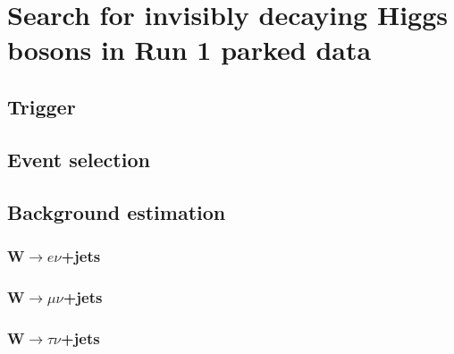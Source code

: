 \chapter{Search for invisibly decaying Higgs bosons in Run 1 parked data}
\label{chap:parked}

\section{Trigger}%
\label{sec:parkedtrigger}

\section{Event selection}%
\label{sec:parkedsel}

\section{Background estimation}%
\label{sec:parkedbkg}

\subsection{W$\rightarrow e\nu$+jets}%
\label{sec:parkedwenu}

\subsection{W$\rightarrow \mu\nu$+jets}%
\label{sec:parkedwmunu}

\subsection{W$\rightarrow \tau\nu$+jets}%
\label{sec:parkedwtaunu}

